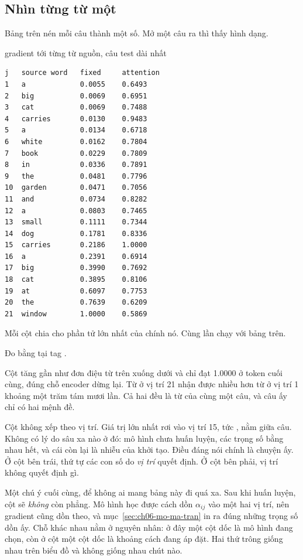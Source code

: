 \subsection*{Nhìn từng từ một}

%
Bảng trên nén mỗi câu thành một số. Mở một câu ra thì thấy hình dạng.

\begin{measured}{gradient tới từng từ nguồn, câu test dài nhất}
\begin{verbatim}
j   source word   fixed     attention
1   a             0.0055    0.6493
2   big           0.0069    0.6951
3   cat           0.0069    0.7488
4   carries       0.0130    0.9483
5   a             0.0134    0.6718
6   white         0.0162    0.7804
7   book          0.0229    0.7809
8   in            0.0336    0.7891
9   the           0.0481    0.7796
10  garden        0.0471    0.7056
11  and           0.0734    0.8282
12  a             0.0803    0.7465
13  small         0.1111    0.7344
14  dog           0.1781    0.8336
15  carries       0.2186    1.0000
16  a             0.2391    0.6914
17  big           0.3990    0.7692
18  cat           0.3895    0.8106
19  at            0.6097    0.7753
20  the           0.7639    0.6209
21  window        1.0000    0.5869
\end{verbatim}

Mỗi cột chia cho phần tử lớn nhất của chính nó. Cùng lần chạy với bảng trên.

Đo bằng  tại tag .
\end{measured}

Cột  tăng gần như đơn điệu từ trên xuống dưới và chỉ đạt 1.0000 ở
token cuối cùng, đúng chỗ encoder dừng lại. Từ  ở vị trí 21 nhận
được nhiều hơn từ  ở vị trí 1 khoảng một trăm tám mươi lần. Cả hai đều
là từ của cùng một câu, và câu ấy chỉ có hai mệnh đề.

Cột  không xếp theo vị trí. Giá trị lớn nhất rơi vào vị trí 15,
tức , nằm giữa câu. Không có lý do sâu xa nào ở đó: mô hình chưa
huấn luyện, các trọng số bằng nhau hết, và cái còn lại là nhiễu của khởi tạo.
Điều đáng nói chính là chuyện ấy. Ở cột bên trái, thứ tự các con số do
\emph{vị trí} quyết định. Ở cột bên phải, vị trí không quyết định gì.

%
Một chú ý cuối cùng, để không ai mang bảng này đi quá xa. Sau khi huấn luyện,
cột  sẽ \emph{không} còn phẳng. Mô hình học được cách dồn
\(\alpha_{ij}\) vào một hai vị trí, nên gradient cũng dồn theo, và
mục~\ref{sec:ch06-mo-ma-tran} in ra đúng những trọng số dồn ấy. Chỗ khác nhau
nằm ở nguyên nhân: ở đây một cột dốc là mô hình đang chọn, còn ở cột
 một cột dốc là khoảng cách đang áp đặt. Hai thứ trông giống nhau
trên biểu đồ và không giống nhau chút nào.
